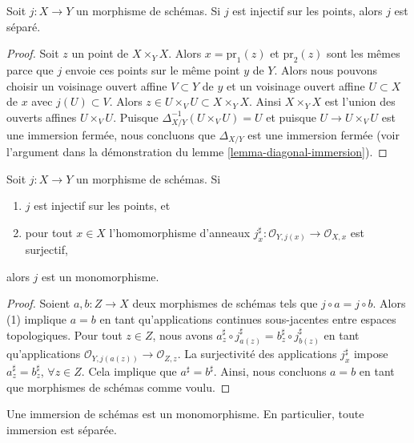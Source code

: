 \begin{lemma}
\label{lemma-injective-points}
Soit $j : X \to Y$ un morphisme de schémas. Si
$j$ est injectif sur les points, alors $j$ est séparé.
\end{lemma}

\begin{proof}
Soit $z$ un point de $X \times_Y X$. Alors $x = \text{pr}_1(z)$ et
$\text{pr}_2(z)$ sont les mêmes parce que $j$ envoie ces points sur le
même point $y$ de $Y$. Alors nous pouvons choisir un voisinage
ouvert affine $V \subset Y$ de $y$ et un voisinage ouvert
affine $U \subset X$ de $x$ avec $j(U) \subset V$. Alors $z
\in U \times_V U \subset X \times_Y X$. Ainsi $X
\times_Y X$ est l'union des ouverts affines $U
\times_V U$. Puisque $\Delta_{X/Y}^{-1}(U \times_V U) = U$ et puisque $U
\to U \times_V U$ est une immersion fermée, nous concluons que
$\Delta_{X/Y}$ est une immersion fermée (voir l'argument dans la
démonstration du lemme \ref{lemma-diagonal-immersion}).
\end{proof}

\begin{lemma}
\label{lemma-injective-points-surjective-stalks}
Soit $j : X \to Y$ un morphisme de schémas.
Si
\begin{enumerate}
\item $j$ est injectif sur les points, et
\item pour tout $x \in X$ l'homomorphisme
d'anneaux $j^\sharp_x : \mathcal{O}_{Y, j(x)} \to \mathcal{O}_{X, x}$
est surjectif,
\end{enumerate}
alors $j$ est un monomorphisme.
\end{lemma}

\begin{proof}
Soient $a, b : Z \to X$ deux morphismes de schémas tels que $j \circ
a = j \circ b$. Alors (1)
implique $a = b$ en tant qu'applications
continues sous-jacentes entre espaces topologiques.
Pour tout $z \in Z$, nous
avons $a^\sharp_z \circ j^\sharp_{a(z)} = b^\sharp_z \circ j^\sharp_{b(z)}$ en
tant qu'applications $\mathcal{O}_{Y, j(a(z))} \to \mathcal{O}_{Z,
z}$. La surjectivité des applications
$j^\sharp_x$ impose $a^\sharp_z = b^\sharp_z$, $\forall z \in Z$. Cela
implique que $a^\sharp = b^\sharp$. Ainsi,
nous concluons $a = b$ en tant que morphismes de schémas
comme voulu.
\end{proof}

\begin{lemma}
\label{lemma-immersions-monomorphisms}
Une immersion de schémas est un monomorphisme.
En particulier, toute immersion est séparée.
\end{lemma}

